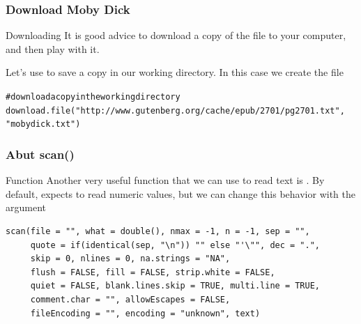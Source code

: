 \documentclass{beamer}\usepackage[]{graphicx}\usepackage[]{color}
\makeatletter
\newcommand{\hlstr}[1]{\textcolor[rgb]{0.063,0.58,0.627}{#1}}%
\newcommand{\hlcom}[1]{\textcolor[rgb]{0.588,0.588,0.588}{#1}}%
\newcommand{\hlstd}[1]{\textcolor[rgb]{0.196,0.196,0.196}{#1}}%
\newcommand{\hlkwd}[1]{\textcolor[rgb]{0.78,0.227,0.412}{#1}}%
\newenvironment{kframe}{%
 \def\at@end@of@kframe{}%
 \ifinner\ifhmode%
  \def\at@end@of@kframe{\end{minipage}}%
  \begin{minipage}{\columnwidth}%
 \fi\fi%
 \def\FrameCommand##1{\hskip\@totalleftmargin \hskip-\fboxsep
 \colorbox{shadecolor}{##1}\hskip-\fboxsep
     \hskip-\linewidth \hskip-\@totalleftmargin \hskip\columnwidth}%
 \MakeFramed {\advance\hsize-\width
   \@totalleftmargin\z@ \linewidth\hsize
   \@setminipage}}%
 {\par\unskip\endMakeFramed%
 \at@end@of@kframe}
\newenvironment{knitrout}{}{} %
\makeatother
\begin{document}

\begin{frame}[fragile]
\frametitle{Download Moby Dick}

\begin{block}{Downloading}
It is good advice to download a copy of the file to your computer, and then play with it. 

\bigskip

Let's use  to save a copy in our working directory. In this case we create the file 

\begin{knitrout}\tiny
{}\color{fgcolor}\begin{kframe}
\begin{alltt}
\hlcom{# download a copy in the working directory}
\hlkwd{download.file}\hlstd{(}\hlstr{"http://www.gutenberg.org/cache/epub/2701/pg2701.txt"}\hlstd{,}
              \hlstr{"mobydick.txt"}\hlstd{)}
\end{alltt}
\end{kframe}
\end{knitrout}
\end{block}

\end{frame}


\begin{frame}[fragile]
\frametitle{Abut scan()}

\begin{block}{Function }
Another very useful function that we can use to read text is . By default,  expects to read numeric values, but we can change this behavior with the argument 

{\footnotesize
\begin{verbatim}
scan(file = "", what = double(), nmax = -1, n = -1, sep = "",
     quote = if(identical(sep, "\n")) "" else "'\"", dec = ".",
     skip = 0, nlines = 0, na.strings = "NA",
     flush = FALSE, fill = FALSE, strip.white = FALSE,
     quiet = FALSE, blank.lines.skip = TRUE, multi.line = TRUE,
     comment.char = "", allowEscapes = FALSE,
     fileEncoding = "", encoding = "unknown", text)
 \end{verbatim}
}

\end{block}

\end{frame}
\end{document}
